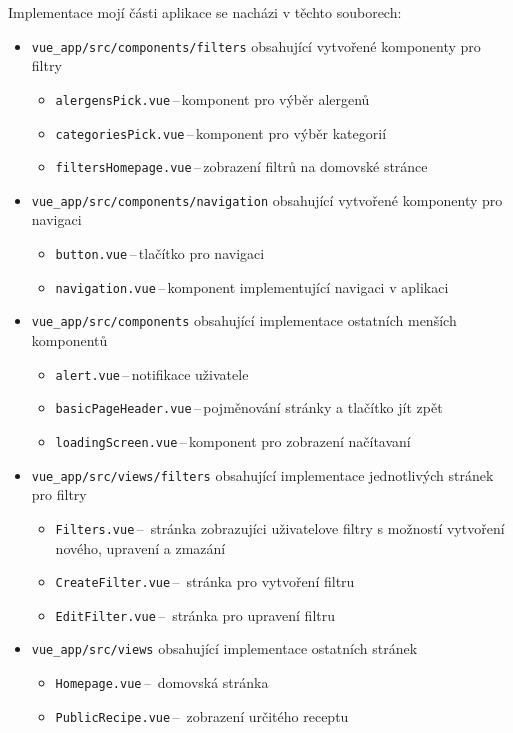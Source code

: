 \documentclass[a4paper, 11pt]{article}
\renewcommand{\t}[1]{\texttt{#1}} %
\begin{document}
Implementace mojí části aplikace se nacházi v těchto souborech:
\begin{itemize}
    \item \t{vue\_app/src/components/filters} obsahující vytvořené komponenty pro filtry
        \begin{itemize}
            \item \t{alergensPick.vue}\,--\,komponent pro výběr alergenů
            \item \t{categoriesPick.vue}\,--\,komponent pro výběr kategorií
            \item \t{filtersHomepage.vue}\,--\,zobrazení filtrů na domovské stránce
        \end{itemize}
    \item \t{vue\_app/src/components/navigation} obsahující vytvořené komponenty pro navigaci
        \begin{itemize}
            \item \t{button.vue}\,--\,tlačítko pro navigaci
            \item \t{navigation.vue}\,--\,komponent implementující navigaci v aplikaci
        \end{itemize}
    \item \t{vue\_app/src/components} obsahující implementace ostatních menších komponentů
        \begin{itemize}
            \item \t{alert.vue}\,--\,notifikace uživatele
            \item \t{basicPageHeader.vue}\,--\,pojměnování stránky a tlačítko jít zpět 
            \item \t{loadingScreen.vue}\,--\,komponent pro zobrazení načítavaní 
        \end{itemize}
    \item \t{vue\_app/src/views/filters} obsahující implementace jednotlivých stránek pro filtry
        \begin{itemize}
            \item \t{Filters.vue}\,--\, stránka zobrazujíci uživatelove filtry s možností vytvoření nového, upravení a zmazání
            \item \t{CreateFilter.vue}\,--\, stránka pro vytvoření filtru
            \item \t{EditFilter.vue}\,--\, stránka pro upravení filtru
        \end{itemize}
    \item \t{vue\_app/src/views} obsahující implementace ostatních stránek 
        \begin{itemize}
            \item \t{Homepage.vue}\,--\, domovská stránka
            \item \t{PublicRecipe.vue}\,--\, zobrazení určitého receptu
        \end{itemize}
\end{itemize}
\end{document}
